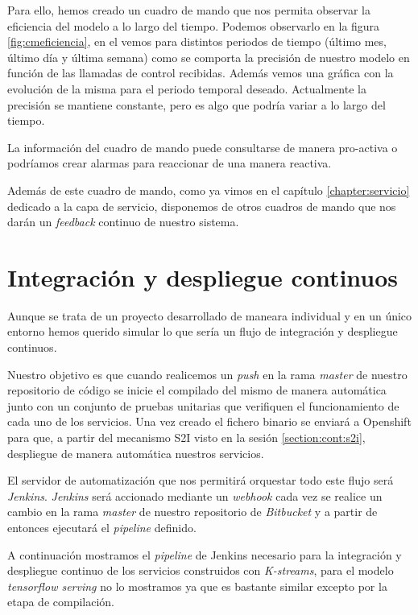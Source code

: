 Para ello, hemos creado un cuadro de mando que nos permita observar la eficiencia del modelo a lo largo del tiempo. Podemos observarlo en la figura \ref{fig:cmeficiencia}, en el vemos para distintos periodos de tiempo (último mes, último día y última semana) como se comporta la precisión de nuestro modelo en función de las llamadas de control recibidas. Además vemos una gráfica con la evolución de la misma para el periodo temporal deseado. Actualmente la precisión se mantiene constante, pero es algo que podría variar a lo largo del tiempo.

La información del cuadro de mando puede consultarse de manera pro-activa o podríamos crear alarmas para reaccionar de una manera reactiva. 

Además de este cuadro de mando, como ya vimos en el capítulo \ref{chapter:servicio} dedicado a la capa de servicio, disponemos de otros cuadros de mando que nos darán un \textit{feedback} continuo de nuestro sistema.


\section{Integración y despliegue continuos}
\label{section:mant:cicd}

Aunque se trata de un proyecto desarrollado de maneara individual y en un único entorno hemos querido simular lo que sería un flujo de integración y despliegue continuos.

Nuestro objetivo es que cuando realicemos un \textit{push} en la rama \textit{master} de nuestro repositorio de código se inicie el compilado del mismo de manera automática junto con un conjunto de pruebas unitarias que verifiquen el funcionamiento de cada uno de los servicios. Una vez creado el fichero binario se enviará a Openshift para que, a partir del mecanismo S2I visto en la sesión \ref{section:cont:s2i}, despliegue de manera automática nuestros servicios.

El servidor de automatización que nos permitirá orquestar todo este flujo será \textit{Jenkins}. \textit{Jenkins} será accionado mediante un \textit{webhook} cada vez se realice un cambio en la rama \textit{master} de nuestro repositorio de \textit{Bitbucket} y a partir de entonces ejecutará el \textit{pipeline} definido.

A continuación mostramos el \textit{pipeline} de Jenkins necesario para la integración y despliegue continuo de los servicios construidos con \textit{K-streams}, para el modelo \textit{tensorflow serving} no lo mostramos ya que es bastante similar excepto por la etapa de compilación.

